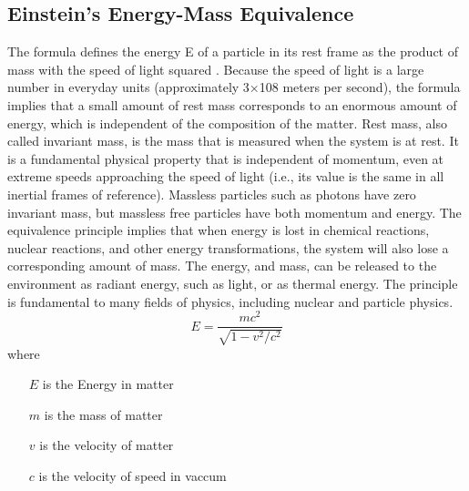 \subsection{Einstein's Energy-Mass Equivalence  }
The formula defines the energy E of a particle in its rest frame as the product of mass  with the speed of light squared . Because the speed of light is a large number in everyday units (approximately 3×108 meters per second), the formula implies that a small amount of rest mass corresponds to an enormous amount of energy, which is independent of the composition of the matter. Rest mass, also called invariant mass, is the mass that is measured when the system is at rest. It is a fundamental physical property that is independent of momentum, even at extreme speeds approaching the speed of light (i.e., its value is the same in all inertial frames of reference). Massless particles such as photons have zero invariant mass, but massless free particles have both momentum and energy. The equivalence principle implies that when energy is lost in chemical reactions, nuclear reactions, and other energy transformations, the system will also lose a corresponding amount of mass. The energy, and mass, can be released to the environment as radiant energy, such as light, or as thermal energy. The principle is fundamental to many fields of physics, including nuclear and particle physics.
\begin{equation}
    E=\frac{mc^2}{\sqrt{1-v^2/c^2}}
    \label{Energy-Mass Equivalence Relation}
\end{equation}
where
\begin{itemize}
    \item[$E$] is the Energy in matter
    \item[$m$] is the mass of matter
    \item[$v$] is the velocity of matter
    \item[$c$] is the velocity of speed in vaccum
\end{itemize}

